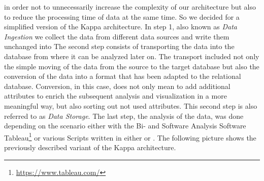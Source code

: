 in order not to unnecessarily increase the complexity of our architecture but also to reduce the processing time of data at the same time.
So we decided for a simplified version of the Kappa architecture.
\newline
In step 1, also known as \textit{Data Ingestion} we collect the data from different data sources and write them unchanged into \gds{}
The second step consists of transporting the data into the \pg{} database from where it can be analyzed later on.
The transport included not only the simple moving of the data from the source to the target database but also the conversion of the data
into a format that has been adapted to the relational database.
Conversion, in this case, does not only mean to add additional attributes to enrich the subsequent analysis and visualization in a more meaningful way,
but also sorting out not used attributes. This second step is also referred to as \textit{Data Storage}.
The last step, the analysis of the data, was done depending on the scenario either with the Bi- and Software Analysis Software Tableau\footnote{\url{https://www.tableau.com/}} or various Scripts written in either  or .
\newline
The following picture shows the previously described variant of the Kappa architecture.
